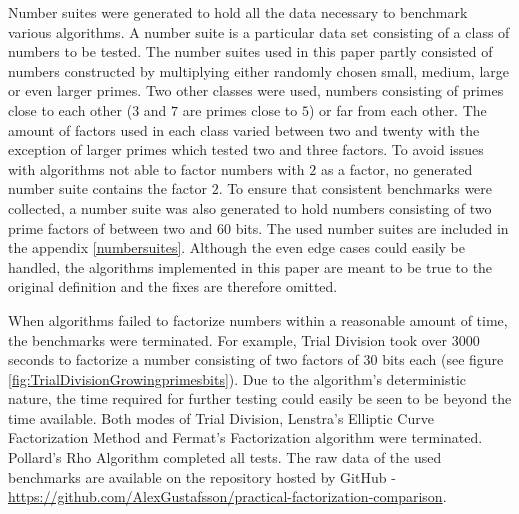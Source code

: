 Number suites were generated to hold all the data necessary to benchmark various algorithms. A number suite is a particular data set consisting of a class of numbers to be tested. The number suites used in this paper partly consisted of numbers constructed by multiplying either randomly chosen small, medium, large or even larger primes. Two other classes were used, numbers consisting of primes close to each other ($3$ and $7$ are primes close to $5$) or far from each other. The amount of factors used in each class varied between two and twenty with the exception of larger primes which tested two and three factors. To avoid issues with algorithms not able to factor numbers with $2$ as a factor, no generated number suite contains the factor $2$. To ensure that consistent benchmarks were collected, a number suite was also generated to hold numbers consisting of two prime factors of between two and 60 bits. The used number suites are included in the appendix \ref{numbersuites}. Although the even edge cases could easily be handled, the algorithms implemented in this paper are meant to be true to the original definition and the fixes are therefore omitted.

When algorithms failed to factorize numbers within a reasonable amount of time, the benchmarks were terminated. For example, Trial Division took over $3000$ seconds to factorize a number consisting of two factors of $30$ bits each (see figure \ref{fig:TrialDivisionGrowingprimesbits}). Due to the algorithm's deterministic nature, the time required for further testing could easily be seen to be beyond the time available. Both modes of Trial Division, Lenstra's Elliptic Curve Factorization Method and Fermat's Factorization algorithm were terminated. Pollard's Rho Algorithm completed all tests. The raw data of the used benchmarks are available on the repository hosted by GitHub - \href{https://github.com/AlexGustafsson/practical-factorization-comparison}{https://github.com/AlexGustafsson/practical-factorization-comparison}.